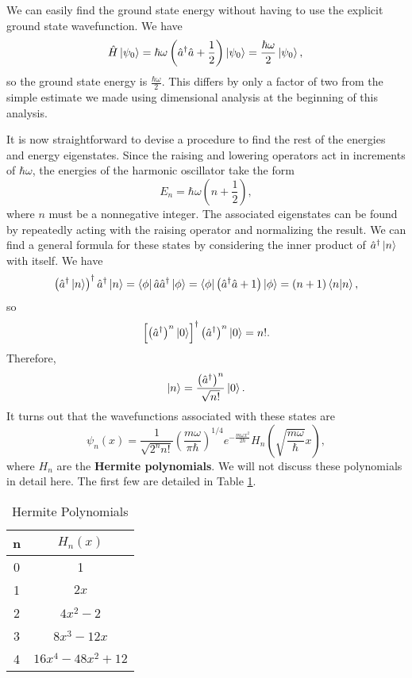 We can easily find the ground state energy without having to use the explicit ground state wavefunction. We have 
\begin{equation}
\hat{H} \left| \psi_0 \right\rangle = \hbar \omega \left(\hat{a}^\dagger\hat{a}+\frac{1}{2} \right) \left| \psi_0 \right\rangle = \frac{\hbar \omega}{2} \left| \psi_0 \right\rangle,\\
\end{equation}
so the ground state energy is $\frac{\hbar \omega}{2}$. This differs by only a factor of two from the simple estimate we made using dimensional analysis at the beginning of this analysis.

It is now straightforward to devise a procedure to find the rest of the energies and energy eigenstates. Since the raising and lowering operators act in increments of $\hbar \omega$, the energies of the harmonic oscillator take the form 
\begin{equation} 
E_n  = \hbar \omega\left(n+\frac{1}{2} \right),
\end{equation}
where $n$ must be a nonnegative integer. The associated eigenstates can be found by repeatedly acting with the raising operator and normalizing the result. We can find a general formula for these states by considering the inner product of $\hat{a}^\dagger \left| n \right\rangle$ with itself. We have 
\begin{equation*}
\left( \hat{a}^\dagger \left| n \right\rangle \right)^\dagger \hat{a}^\dagger\left| n \right\rangle = \left\langle \phi \right|  \hat{a} \hat{a}^\dagger\left| \phi \right\rangle = \left\langle \phi \right|  \left( \hat{a}^\dagger\hat{a} + 1\right)\left| \phi \right\rangle  = (n+1) \left\langle n \middle| n \right\rangle,
\end{equation*}
so 
\begin{equation*}
\left[\left( \hat{a}^\dagger\right)^n \left| 0 \right\rangle \right]^\dagger\left( \hat{a}^\dagger\right)^n\left| 0 \right\rangle = n!.
\end{equation*}
Therefore,
\begin{equation}
\left| n \right\rangle = \frac{\left( \hat{a}^\dagger\right)^n}{\sqrt{n!}} \left| 0 \right\rangle.
\end{equation}
It turns out that the wavefunctions associated with these states are 
\begin{equation} \psi_n (x) = \frac{1}{\sqrt{2^n n!}} \left (\frac{m\omega}{\pi \hbar} \right)^{1/4} e^{-\frac{m \omega x^2}{2\hbar}} H_n \left(\sqrt{\frac{m\omega}{\hbar}} x\right), \end{equation} where $H_n$ are the \textbf{Hermite polynomials}. We will not discuss these polynomials in detail here. The first few are detailed in Table \ref{hermite}. 
\begin{table}[ht]
\centering
\caption{Hermite Polynomials}
\begin{tabular}{|c|c|}
\hline
n & $H_n (x)$ \\
\hline
0 & 1 \\
1 & $2x$ \\
2 & $4x^2-2$ \\
3 & $8x^3-12x$ \\
4 & $16 x^4-48 x^2 +12$ \\
\hline
\end{tabular}
\label{hermite}
\end{table}

